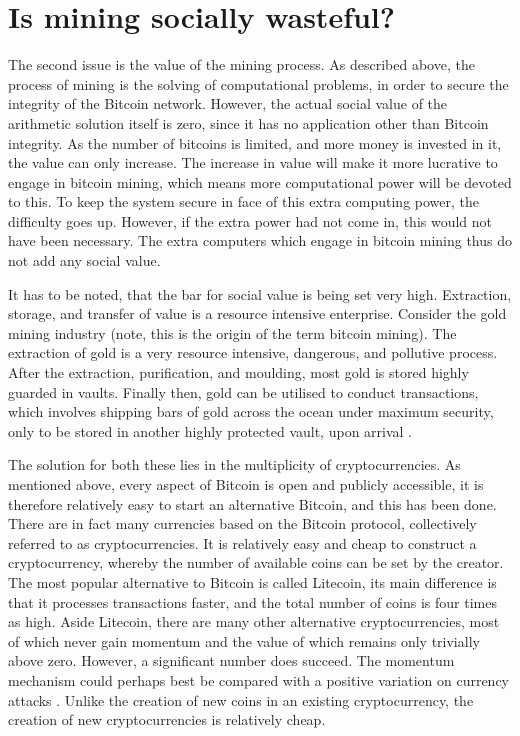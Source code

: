 
\chapter{Is mining socially wasteful?}

The second issue is the value of the mining process. As described
above, the process of mining is the solving of computational problems,
in order to secure the integrity of the Bitcoin network. However,
the actual social value of the arithmetic solution itself is zero,
since it has no application other than Bitcoin integrity. As the number
of bitcoins is limited, and more money is invested in it, the value
can only increase. The increase in value will make it more lucrative
to engage in bitcoin mining, which means more computational power
will be devoted to this. To keep the system secure in face of this
extra computing power, the difficulty goes up. However, if the extra
power had not come in, this would not have been necessary. The extra
computers which engage in bitcoin mining thus do not add any social
value.

It has to be noted, that the bar for social value is being set very
high. Extraction, storage, and transfer of value is a resource intensive
enterprise. Consider the gold mining industry (note, this is the origin
of the term bitcoin mining). The extraction of gold is a very resource
intensive, dangerous, and pollutive process. After the extraction,
purification, and moulding, most gold is stored highly guarded in
vaults. Finally then, gold can be utilised to conduct transactions,
which involves shipping bars of gold across the ocean under maximum
security, only to be stored in another highly protected vault, upon
arrival \citep[see e.g.][]{friedman2008monetary}.

The solution for both these lies in the multiplicity of cryptocurrencies.
As mentioned above, every aspect of Bitcoin is open and publicly accessible,
it is therefore relatively easy to start an alternative Bitcoin, and
this has been done. There are in fact many currencies based on the
Bitcoin protocol, collectively referred to as cryptocurrencies. It
is relatively easy and cheap to construct a cryptocurrency, whereby
the number of available coins can be set by the creator. The most
popular alternative to Bitcoin is called Litecoin, its main difference
is that it processes transactions faster, and the total number of
coins is four times as high. Aside Litecoin, there are many other
alternative cryptocurrencies, most of which never gain momentum and
the value of which remains only trivially above zero. However, a significant
number does succeed. The momentum mechanism could perhaps best be
compared with a positive variation on currency attacks \citep{obstfeld1986rational,obstfeld1995logic,obstfeld1996models}.
Unlike the creation of new coins in an existing cryptocurrency, the
creation of new cryptocurrencies is relatively cheap.

